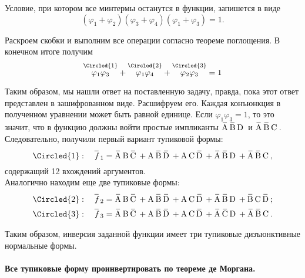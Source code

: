 \documentclass[a4paper, 14pt]{extarticle}
\begin{document}
Условие, при котором все минтермы останутся в функции, запишется в виде
\begin{equation*}
  (\varphi_1 + \varphi_2)(\varphi_3 + \varphi_4)(\varphi_1 + \varphi_3) = 1.
\end{equation*}

Раскроем скобки и выполним все операции согласно теореме поглощения. В конечном итоге
получим
\begin{equation*}
  \overset{\Circled{1}}{\varphi_1 \varphi_3 \vphantom{\text{\normalsize I}}} + 
  \overset{\Circled{2}}{\varphi_1 \varphi_4 \vphantom{\text{\normalsize I}}} + 
  \overset{\Circled{3}}{\varphi_2 \varphi_3 \vphantom{\text{\normalsize I}}} = 1
\end{equation*}

Таким образом, мы нашли ответ на поставленную задачу, правда, пока этот ответ 
представлен в зашифрованном виде. Расшифруем его. Каждая конъюнкция в полученном 
уравнении может быть равной единице. Если $\varphi_1 \varphi_3 = 1$, то это значит, 
что в функцию должны войти простые импликанты $\OV{A}\OV{B}\NOV{D}$ и $\OV{A}\OV{B}\NOV{C}$. 
Следовательно, получили первый вариант тупиковой формы:
\begin{equation*}
  \Circled{1}: \quad \OV{\itshape f}_1 = \OV{A}\NOV{B}\OV{C} + \NOV{A}\OV{B}\OV{D} + \NOV{A}\NOV{C}\OV{D} + 
  \OV{A}\OV{B}\NOV{D} + \OV{A}\OV{B}\NOV{C},
\end{equation*}
содержащий 12 вхождений аргументов.\\ 

Аналогично находим еще две тупиковые формы:
\begin{align*}
  \Circled{2}: \quad \OV{\itshape f}_2 = \OV{A}\NOV{B}\OV{C} + \NOV{A}\OV{B}\OV{D} + \NOV{A}\NOV{C}\OV{D} + 
  \OV{A}\OV{B}\NOV{D} + \OV{B}\NOV{C}\OV{D}; \\
  \Circled{3}: \quad \OV{\itshape f}_3 = \OV{A}\NOV{B}\OV{C} + \NOV{A}\OV{B}\OV{D} + \NOV{A}\NOV{C}\OV{D} + 
  \OV{A}\OV{C}\NOV{D} + \OV{A}\OV{B}\NOV{C}.
\end{align*}

Таким образом, инверсия заданной функции имеет три тупиковые дизъюнктивные нормальные 
формы.

\paragraph{Все тупиковые форму проинвертировать по теореме де Моргана.}
\end{document}
